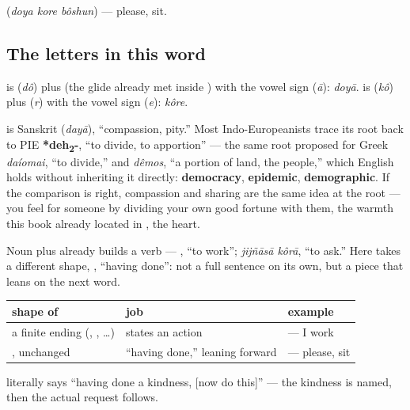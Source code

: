    (\emph{doya kore bôshun}) — please, sit.

\subsection*{The letters in this word}
\textbf{} is \textbf{} (\emph{dô}) plus \textbf{} (the glide already met inside ) with the vowel sign \textbf{} (\emph{ā}): \emph{doyā}. \textbf{} is \textbf{} (\emph{kô}) plus \textbf{} (\emph{r}) with the vowel sign \textbf{} (\emph{e}): \emph{kôre}.

\begin{cousinweb}
\textbf{} is Sanskrit \textbf{} (\emph{dayā}), \textquotedblleft{}compassion, pity.\textquotedblright{} Most Indo-Europeanists trace its root back to PIE \textbf{*deh\textsubscript{2}-}, \textquotedblleft{}to divide, to apportion\textquotedblright{} — the same root proposed for Greek \emph{daíomai}, \textquotedblleft{}to divide,\textquotedblright{} and \emph{dêmos}, \textquotedblleft{}a portion of land, the people,\textquotedblright{} which English holds without inheriting it directly: \textbf{democracy}, \textbf{epidemic}, \textbf{demographic}. If the comparison is right, compassion and sharing are the same idea at the root — you feel  for someone by dividing your own good fortune with them, the warmth this book already located in \textbf{}, the heart.
\end{cousinweb}

\begin{grammarlens}[title={Grammar Lens: \bn{করা} wears a new outfit}]
Noun plus  already builds a verb —  , \textquotedblleft{}to work\textquotedblright{}; \emph{jijñāsā kôrā}, \textquotedblleft{}to ask.\textquotedblright{} Here  takes a different shape, \textbf{}, \textquotedblleft{}having done\textquotedblright{}: not a full sentence on its own, but a piece that leans on the next word.

\noindent
\begin{tabularx}{\linewidth}{@{}>{\raggedright\arraybackslash}X>{\raggedright\arraybackslash}X>{\raggedright\arraybackslash}X@{}}
\toprule
\textbf{shape of \bn{করা}} & \textbf{job} & \textbf{example} \\
\midrule
a finite ending (\bn{করি}, \bn{করে}, \bn{করেন}…) & states an action & \bn{আমি} \bn{কাজ} \bn{করি} — I work \\
\textbf{\bn{করে}}, unchanged & \textquotedblleft{}having done,\textquotedblright{} leaning forward & \textbf{\bn{দয়া} \bn{করে} \bn{বসুন}} — please, sit \\
\bottomrule
\end{tabularx}

  literally says \textquotedblleft{}having done a kindness, {[}now do this{]}\textquotedblright{} — the kindness is named, then the actual request follows.
\end{grammarlens}


